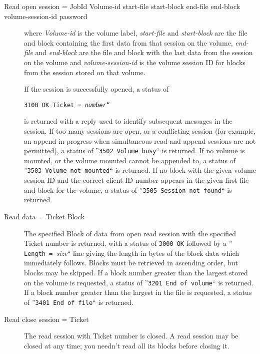 \begin{description}

\item [Read open session = \lt{}JobId\gt{} \lt{}Volume-id\gt{}
   \lt{}start-file\gt{} \lt{}start-block\gt{}  \lt{}end-file\gt{}
   \lt{}end-block\gt{} \lt{}volume-session-id\gt{} \lt{}password\gt{}  ]
where {\it Volume-id} is the volume label,  {\it start-file} and {\it
start-block} are the file and block containing the  first data from that
session on the volume, {\it end-file} and  {\it end-block} are the file and
block with the last data from the session on  the volume and {\it
volume-session-id} is the volume session ID for blocks from the  session
stored on that volume.  

If the session is successfully opened, a status of  

{\tt {\tt 3100\ OK Ticket\ =\ }{\it number}``}  

is returned with a reply used to identify  subsequent messages in the session.
If too many sessions are open, or a  conflicting session (for example, an
append in progress when simultaneous read  and append sessions are not
permitted), a status of  ''{\tt 3502\ Volume\ busy}`` is returned. If no
volume is mounted, or  the volume mounted cannot be appended to, a status of 
''{\tt 3503\ Volume\ not\ mounted}`` is returned. If no block with  the given
volume session ID and the correct client ID number appears in the  given first
file and block for the volume, a status of  ''{\tt 3505\ Session\ not\
found}`` is returned.  

\item [Read data = \lt{}Ticket\gt{} \gt{} \lt{}Block\gt{}  ]
   The specified Block of data from open read session with the specified Ticket
number  is returned, with a status of {\tt 3000\ OK} followed  by a ''{\tt
Length\ =\ }{\it size}`` line giving the length in  bytes of the block data
which immediately follows. Blocks must be retrieved in  ascending order, but
blocks may be skipped. If a block number greater than the  largest stored on
the volume is requested, a status of  ''{\tt 3201\ End\ of\ volume}`` is
returned. If a block number  greater than the largest in the file is
requested, a status of  ''{\tt 3401\ End\ of\ file}`` is returned.  

\item [Read close session = \lt{}Ticket\gt{}  ]
   The read session with Ticket number is closed. A read session  may be closed
at any time; you needn't read all its blocks before closing it.  
\end{description}

